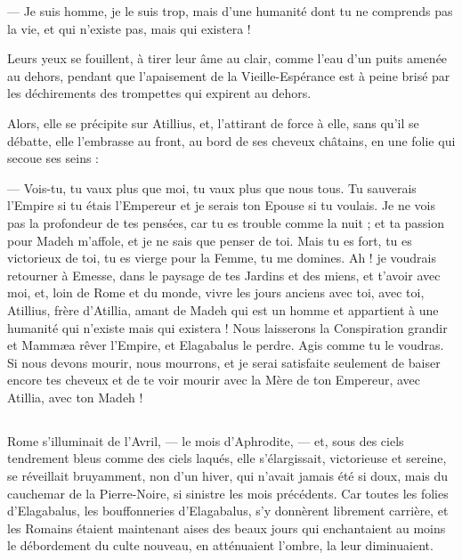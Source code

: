 \documentclass[a4paper, 11pt, oneside, polutonikogreek, french]{article}
\begin{document}
--- Je suis homme, je le suis trop, mais d'une humanité dont tu ne comprends pas la vie, et qui n'existe pas, mais qui existera !

Leurs yeux se fouillent, à tirer leur âme au clair, comme l'eau d'un puits amenée au dehors, pendant que l'apaisement de la Vieille-Espérance est à peine brisé par les déchirements des trompettes qui expirent au dehors.

Alors, elle se précipite sur Atillius, et, l'attirant de force à elle, sans qu'il se débatte, elle l'embrasse au front, au bord de ses cheveux châtains, en une folie qui secoue ses seins :

--- Vois-tu, tu vaux plus que moi, tu vaux plus que nous tous. Tu sauverais l'Empire si tu étais l'Empereur et je serais ton Epouse si tu voulais. Je ne vois pas la profondeur de tes pensées, car tu es trouble comme la nuit ; et ta passion pour Madeh m'affole, et je ne sais que penser de toi. Mais tu es fort, tu es victorieux de toi, tu es vierge pour la Femme, tu me domines. Ah ! je voudrais retourner à Emesse, dans le paysage de tes Jardins et des miens, et t'avoir avec moi, et, loin de Rome et du monde, vivre les jours anciens avec toi, avec toi, Atillius, frère d'Atillia, amant de Madeh qui est un homme et appartient à une humanité qui n'existe mais qui existera ! Nous laisserons la Conspiration grandir et Mammæa rêver l'Empire, et Elagabalus le perdre. Agis comme tu le voudras. Si nous devons mourir, nous mourrons, et je serai satisfaite seulement de baiser encore tes cheveux et de te voir mourir avec la Mère de ton Empereur, avec Atillia, avec ton Madeh !
\clearpage
\subsection{}
\paragraph{}
Rome s'illuminait de l'Avril, --- le mois d'Aphrodite, --- et, sous des ciels tendrement bleus comme des ciels laqués, elle s'élargissait, victorieuse et sereine, se réveillait bruyamment, non d'un hiver, qui n'avait jamais été si doux, mais du cauchemar de la Pierre-Noire, si sinistre les mois précédents. Car toutes les folies d'Elagabalus, les bouffonneries d'Elagabalus, s'y donnèrent librement carrière, et les Romains étaient maintenant aises des beaux jours qui enchantaient au moins le débordement du culte nouveau, en atténuaient l'ombre, la leur diminuaient.
\end{document}
